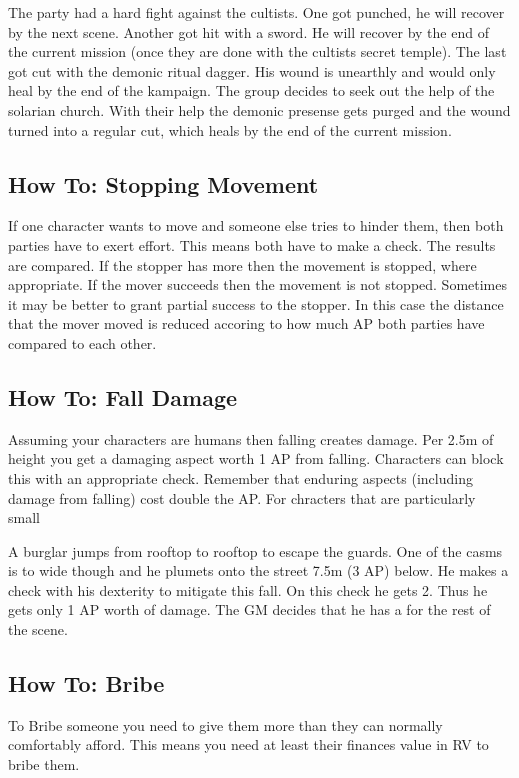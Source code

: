 \documentclass[11pt]{article}
\begin{document}
{\begin{pwexample}
The party had a hard fight against the cultists. One got punched, he will recover by the next scene. Another got hit with a sword. He will recover by the end of the current mission (once they are done with the cultists secret temple). The last got cut with the demonic ritual dagger. His wound is unearthly and would only heal by the end of the kampaign. The group decides to seek out the help of the solarian church. With their help the demonic presense gets purged  and the wound turned into a regular cut, which heals by the end of the current mission.
\end{pwexample}
\subsection{How To: Stopping Movement}
\label{sec:orgc2e452d}
If one character wants to move and someone else tries to hinder them, then both parties have to exert effort. This means both have to make a check. The results are compared. If the stopper has more then the movement is stopped, where appropriate. If the mover succeeds then the movement is not stopped. Sometimes it may be better to grant partial success to the stopper. In this case the distance that the mover moved is reduced accoring to how much AP both parties have compared to each other.
\subsection{How To: Fall Damage}
\label{sec:org3d4343b}
Assuming your characters are humans then falling creates damage. Per 2.5m of height you get a damaging aspect worth 1 AP from falling. Characters can block this with an appropriate check. Remember that enduring aspects (including damage from falling) cost double the AP.
For chracters that are particularly small

\begin{pwexample}
A burglar jumps from rooftop to rooftop to escape the guards. One of the casms is to wide though and he plumets onto the street 7.5m (3 AP) below. He makes a check with his dexterity to mitigate this fall. On this check he gets 2. Thus he gets only 1 AP worth of damage. The GM decides that he has a  for the rest of the scene.
\end{pwexample}
\subsection{How To: Bribe}
\label{sec:orgc7d1221}
To Bribe someone you need to give them more than they can normally comfortably afford. This means you need at least their finances value in RV to bribe them.
}
\end{document}
